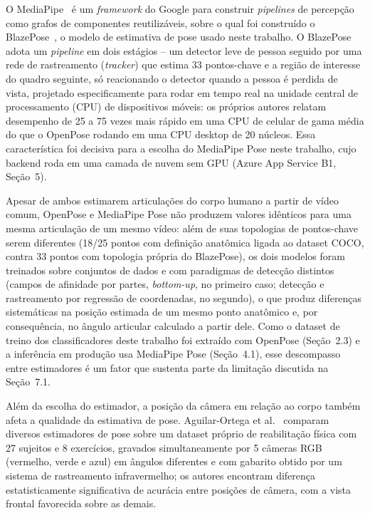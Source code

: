 \documentclass[12pt]{article}
\begin{document}
O MediaPipe~\cite{lugaresi2019mediapipe} é um \textit{framework} do Google
para construir \textit{pipelines} de percepção como grafos de componentes
reutilizáveis, sobre o qual foi construído o BlazePose~\cite{bazarevsky2020blazepose},
o modelo de estimativa de pose usado neste trabalho. O BlazePose adota um
\textit{pipeline} em dois estágios -- um detector leve de pessoa seguido por
uma rede de rastreamento (\textit{tracker}) que estima 33 pontos-chave e a
região de interesse do quadro seguinte, só reacionando o detector quando a
pessoa é perdida de vista, projetado especificamente para rodar em tempo
real na unidade central de processamento (CPU) de dispositivos móveis: os próprios autores relatam desempenho
de 25 a 75 vezes mais rápido em uma CPU de celular de gama média do que o
OpenPose rodando em uma CPU desktop de 20 núcleos. Essa característica foi
decisiva para a escolha do MediaPipe Pose neste trabalho, cujo backend roda
em uma camada de nuvem sem GPU (Azure App Service B1, Seção~5).

Apesar de ambos estimarem articulações do corpo humano a partir de vídeo
comum, OpenPose e MediaPipe Pose não produzem valores idênticos para uma
mesma articulação de um mesmo vídeo: além de suas topologias de pontos-chave
serem diferentes (18/25 pontos com definição anatômica ligada ao dataset
COCO, contra 33 pontos com topologia própria do BlazePose), os dois modelos
foram treinados sobre conjuntos de dados e com paradigmas de detecção
distintos (campos de afinidade por partes, \textit{bottom-up}, no primeiro
caso; detecção e rastreamento por regressão de coordenadas, no segundo), o
que produz diferenças sistemáticas na posição estimada de um mesmo ponto
anatômico e, por consequência, no ângulo articular calculado a partir dele.
Como o dataset de treino dos classificadores deste trabalho foi extraído com
OpenPose (Seção~2.3) e a inferência em produção usa MediaPipe Pose
(Seção~4.1), esse descompasso entre estimadores é um fator que sustenta
parte da limitação discutida na Seção~7.1.

Além da escolha do estimador, a posição da câmera em relação ao corpo
também afeta a qualidade da estimativa de pose. Aguilar-Ortega et
al.~\cite{aguilarortega2023uco} comparam diversos estimadores de pose
sobre um dataset próprio de reabilitação física com 27 sujeitos e 8
exercícios, gravados simultaneamente por 5 câmeras RGB (vermelho, verde e azul) em ângulos
diferentes e com gabarito obtido por um sistema de rastreamento
infravermelho; os autores encontram diferença estatisticamente
significativa de acurácia entre posições de câmera, com a vista frontal
favorecida sobre as demais.
\end{document}
